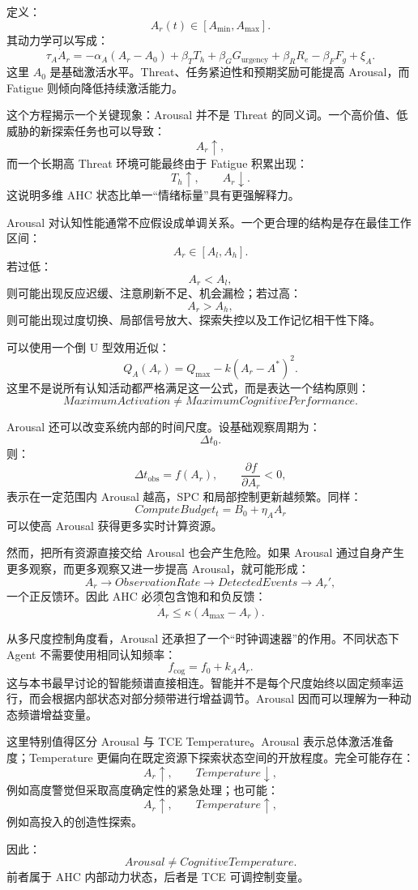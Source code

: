 定义：
\[
A_r(t)\in[A_{\min},A_{\max}].
\]
其动力学可以写成：
\[
\tau_A\dot A_r
=
-\alpha_A(A_r-A_0)
+
\beta_T T_h
+
\beta_G G_{\mathrm{urgency}}
+
\beta_R R_e
-
\beta_F F_g
+
\xi_A.
\]
这里 \(A_0\) 是基础激活水平。Threat、任务紧迫性和预期奖励可能提高 Arousal，而 Fatigue 则倾向降低持续激活能力。

这个方程揭示一个关键现象：Arousal 并不是 Threat 的同义词。一个高价值、低威胁的新探索任务也可以导致：
\[
A_r\uparrow,
\]
而一个长期高 Threat 环境可能最终由于 Fatigue 积累出现：
\[
T_h\uparrow,\qquad A_r\downarrow.
\]
这说明多维 AHC 状态比单一“情绪标量”具有更强解释力。

Arousal 对认知性能通常不应假设成单调关系。一个更合理的结构是存在最佳工作区间：
\[
A_r\in[A_l,A_h].
\]
若过低：
\[
A_r<A_l,
\]
则可能出现反应迟缓、注意刷新不足、机会漏检；若过高：
\[
A_r>A_h,
\]
则可能出现过度切换、局部信号放大、探索失控以及工作记忆相干性下降。

可以使用一个倒 U 型效用近似：
\[
Q_A(A_r)
=
Q_{\max}
-
k(A_r-A^\ast)^2.
\]
这里不是说所有认知活动都严格满足这一公式，而是表达一个结构原则：
\[
\boxed{
MaximumActivation
\neq
MaximumCognitivePerformance.
}
\]

Arousal 还可以改变系统内部的时间尺度。设基础观察周期为：
\[
\Delta t_0.
\]
则：
\[
\Delta t_{\mathrm{obs}}
=
f(A_r),
\qquad
\frac{\partial f}{\partial A_r}<0,
\]
表示在一定范围内 Arousal 越高，SPC 和局部控制更新越频繁。同样：
\[
ComputeBudget_t
=
B_0+\eta_AA_r
\]
可以使高 Arousal 获得更多实时计算资源。

然而，把所有资源直接交给 Arousal 也会产生危险。如果 Arousal 通过自身产生更多观察，而更多观察又进一步提高 Arousal，就可能形成：
\[
A_r
\rightarrow
ObservationRate
\rightarrow
DetectedEvents
\rightarrow
A_r',
\]
一个正反馈环。因此 AHC 必须包含饱和和负反馈：
\[
\dot A_r
\leq
\kappa(A_{\max}-A_r).
\]

从多尺度控制角度看，Arousal 还承担了一个“时钟调速器”的作用。不同状态下 Agent 不需要使用相同认知频率：
\[
f_{\mathrm{cog}}
=
f_0
+
k_A A_r.
\]
这与本书最早讨论的智能频谱直接相连。智能并不是每个尺度始终以固定频率运行，而会根据内部状态对部分频带进行增益调节。Arousal 因而可以理解为一种动态频谱增益变量。

这里特别值得区分 Arousal 与 TCE Temperature。Arousal 表示总体激活准备度；Temperature 更偏向在既定资源下探索状态空间的开放程度。完全可能存在：
\[
A_r\uparrow,\qquad Temperature\downarrow,
\]
例如高度警觉但采取高度确定性的紧急处理；也可能：
\[
A_r\uparrow,\qquad Temperature\uparrow,
\]
例如高投入的创造性探索。

因此：
\[
\boxed{
Arousal\neq CognitiveTemperature.
}
\]
前者属于 AHC 内部动力状态，后者是 TCE 可调控制变量。

